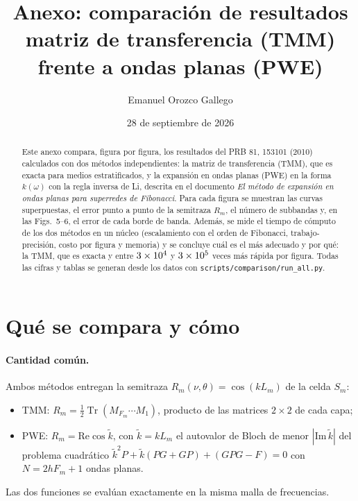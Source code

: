 \documentclass[11pt,a4paper]{article}
\title{Anexo: comparación de resultados\\
matriz de transferencia (TMM) frente a ondas planas (PWE)}
\author{Emanuel Orozco Gallego}
\date{28 de septiembre de 2026}
\newcommand{\code}[1]{\texttt{#1}}
\begin{document}
\maketitle

\begin{abstract}
Este anexo compara, figura por figura, los resultados del PRB 81, 153101 (2010)
calculados con dos métodos independientes: la matriz de transferencia (TMM),
que es exacta para medios estratificados, y la expansión en ondas planas (PWE)
en la forma $k(\omega)$ con la regla inversa de Li, descrita en el documento
\textit{El método de expansión en ondas planas para superredes de Fibonacci}.
Para cada figura se muestran las curvas superpuestas, el error punto a punto de
la semitraza $R_m$, el número de subbandas y, en las Figs.~5--6, el error de
cada borde de banda. Además, se mide el tiempo de cómputo de los dos métodos en
un núcleo (escalamiento con el orden de Fibonacci, trabajo-precisión, costo por
figura y memoria) y se concluye cuál es el más adecuado y por qué: la TMM, que es
exacta y entre $3\times10^{4}$ y $3\times10^{5}$ veces más rápida por figura.
Todas las cifras y tablas se generan desde los datos con
\code{scripts/comparison/run\_all.py}.
\end{abstract}

\tableofcontents

\section{Qué se compara y cómo}

\paragraph{Cantidad común.} Ambos métodos entregan la semitraza
$R_m(\nu,\theta)=\cos(kL_m)$ de la celda $S_m$:
\begin{itemize}
\item TMM: $R_m=\tfrac12\operatorname{Tr}(M_{F_m}\cdots M_1)$, producto de las
matrices $2\times2$ de cada capa;
\item PWE: $R_m=\mathrm{Re}\cos\tilde k$, con $\tilde k=kL_m$ el autovalor de
Bloch de menor $|\mathrm{Im}\,\tilde k|$ del problema cuadrático
$\tilde k^2P+\tilde k(PG+GP)+(GPG-F)=0$ con $N=2hF_m+1$ ondas planas.
\end{itemize}
Las dos funciones se evalúan exactamente en la misma malla de frecuencias.
\end{document}
